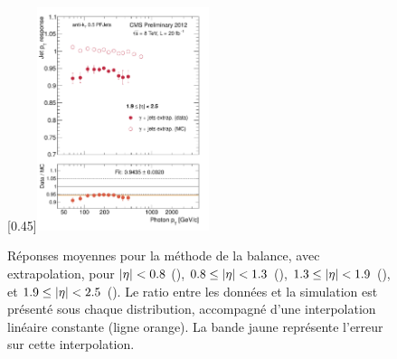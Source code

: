 \begin{figure}[p!]
    \subcaptionbox{\label{fig:bal_extrap_eta1925}}[0.45\textwidth]{\includegraphics[width=0.45\textwidth]{chapitre4/figs/resp_balancing_extrap/response_eta1925_balancing_extrap.pdf}}
    \caption{Réponses moyennes pour la méthode de la balance, avec extrapolation, pour $\lvert \eta \rvert < \num{0.8}$ (), $\num{0.8} \leq \lvert \eta \rvert < \num{1.3}$ (), $\num{1.3} \leq \lvert \eta \rvert < \num{1.9}$ (), et $\num{1.9} \leq \lvert \eta \rvert < \num{2.5}$ (). Le ratio entre les données et la simulation est présenté sous chaque distribution, accompagné d'une interpolation linéaire constante (ligne orange). La bande jaune représente l'erreur sur cette interpolation.}
    \label{fig:balancing_extrap_resp}
\end{figure}


